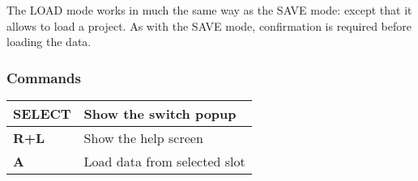 The LOAD mode works in much the same way as the SAVE mode: except that it allows to load a project.
As with the SAVE mode, confirmation is required before loading the data.


\subsubsection{Commands}
\tablelasttail{\hline}
\begin{supertabular}{|l|p{11cm}|}
    {\bf SELECT} & Show the switch popup \\
    \hline
    {\bf R+L} & Show the help screen \\
    \hline
    {\bf A} & Load data from selected slot \\
\end{supertabular}

